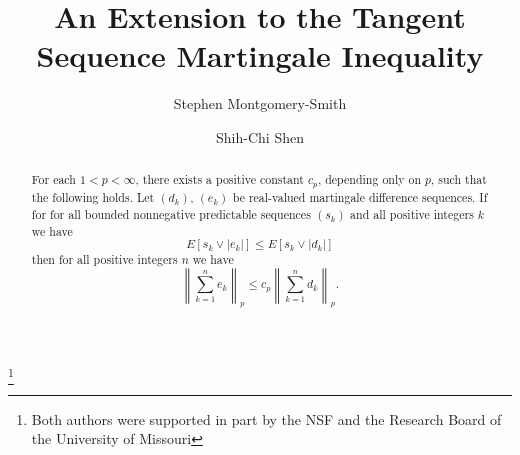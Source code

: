 \documentclass[12pt]{amsart}
\begin{document}
\title[Extension to a Martingale Inequality]{An Extension to the 
Tangent Sequence Martingale Inequality}
\author{Stephen Montgomery-Smith}
\address{Department of Mathematics\\
University of Missouri\\
Columbia, Missouri 65211, USA.}
\author{ Shih-Chi Shen }
\address{Department of Mathematics\\
University of Missouri\\
Columbia, Missouri 65211, USA.}
\thanks{Both authors were supported in part by the NSF
and the Research Board of the University of Missouri}

\begin{abstract}
For each $1<p<\infty$, there exists a positive constant $c_p$, 
depending only on $p$, such
that the following holds.  Let $(d_k)$, $(e_k)$ be real-valued martingale
difference sequences. If for for all bounded nonnegative predictable 
sequences $(s_k)$ and all positive integers $k$ we have
\[E[s_k \vee |e_k|]\leq E[s_k \vee |d_k|]\]
then for all positive integers $n$ we have
\[ \left\| \sum_{k=1}^n e_k \right\|_p 
\leq  c_p \left\| \sum_{k=1}^n d_k \right\|_p .\]
\end{abstract}
\maketitle
\end{document}
